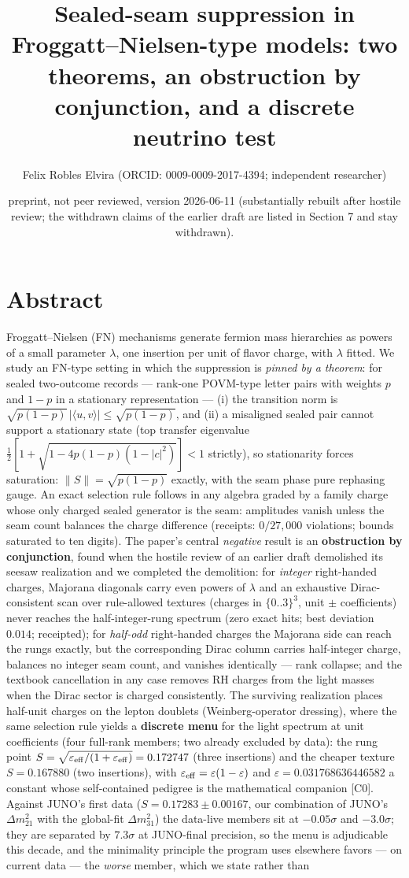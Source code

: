 \documentclass[11pt]{article}
\title{Sealed-seam suppression in Froggatt–Nielsen-type models: two theorems, an obstruction by conjunction, and a discrete neutrino test}
\author{Felix Robles Elvira (ORCID: 0009-0009-2017-4394; independent researcher)}
\date{\small preprint, not peer reviewed, version 2026-06-11 (substantially rebuilt after hostile review; the withdrawn claims of the earlier draft are listed in Section 7 and stay withdrawn).}
\begin{document}
\maketitle

\section*{Abstract}
Froggatt–Nielsen (FN) mechanisms generate fermion mass hierarchies as powers of a small parameter $\lambda$, one insertion per unit of flavor charge, with $\lambda$ fitted.  We study an FN-type setting in which the suppression is \emph{pinned by a theorem}: for sealed two-outcome records — rank-one POVM-type letter pairs with weights $p$ and $1-p$ in a stationary representation — (i) the transition norm is $\sqrt{p(1-p)}\,|\langle u,v\rangle| \le \sqrt{p(1-p)}$, and (ii) a misaligned sealed pair cannot support a stationary state (top transfer eigenvalue $\tfrac12[1+\sqrt{1-4p(1-p) (1-|c|^2)}] < 1$ strictly), so stationarity forces saturation: $\lVert S\rVert = \sqrt{p(1-p)}$ exactly, with the seam phase pure rephasing gauge.  An exact selection rule follows in any algebra graded by a family charge whose only charged sealed generator is the seam: amplitudes vanish unless the seam count balances the charge difference (receipts: $0/27{,}000$ violations; bounds saturated to ten digits).  The paper's central \emph{negative} result is an \textbf{obstruction by conjunction}, found when the hostile review of an earlier draft demolished its seesaw realization and we completed the demolition: for \emph{integer} right-handed charges, Majorana diagonals carry even powers of $\lambda$ and an exhaustive Dirac-consistent scan over rule-allowed textures (charges in $\{0..3\}^3$, unit $\pm$ coefficients) never reaches the half-integer-rung spectrum (zero exact hits; best deviation $0.014$; receipted); for \emph{half-odd} right-handed charges the Majorana side can reach the rungs exactly, but the corresponding Dirac column carries half-integer charge, balances no integer seam count, and vanishes identically — rank collapse; and the textbook cancellation in any case removes RH charges from the light masses when the Dirac sector is charged consistently.  The surviving realization places half-unit charges on the lepton doublets (Weinberg-operator dressing), where the same selection rule yields a \textbf{discrete menu} for the light spectrum at unit coefficients (four full-rank members; two already excluded by data): the rung point $S = \sqrt{\varepsilon_{\rm eff}/(1+\varepsilon_{\rm eff})} = 0.172747$ (three insertions) and the cheaper texture $S = 0.167880$ (two insertions), with $\varepsilon_{\rm eff} = \varepsilon(1-\varepsilon)$ and $\varepsilon = 0.031768636446582$ a constant whose self-contained pedigree is the mathematical companion [C0].  Against JUNO's first data ($S = 0.17283 \pm 0.00167$, our combination of JUNO's $\Delta m^2_{21}$ with the global-fit $\Delta m^2_{31}$) the data-live members sit at $-0.05\sigma$ and $-3.0\sigma$; they are separated by $7.3\sigma$ at JUNO-final precision, so the menu is adjudicable this decade, and the minimality principle the program uses elsewhere favors — on current data — the \emph{worse} member, which we state rather than 
\end{document}
